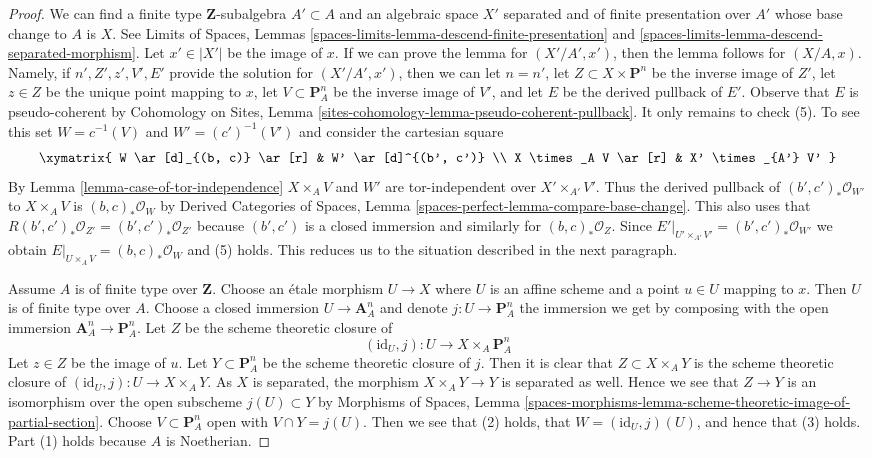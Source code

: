 \begin{proof}
We can find a finite type $\mathbf{Z}$-subalgebra $A' \subset A$
and an algebraic space $X'$ separated and of finite presentation over $A'$
whose base change to $A$ is $X$. See
Limits of Spaces, Lemmas
\ref{spaces-limits-lemma-descend-finite-presentation} and
\ref{spaces-limits-lemma-descend-separated-morphism}.
Let $x' \in |X'|$ be the image of $x$.
If we can prove the lemma for $(X'/A', x')$, then
the lemma follows for $(X/A, x)$.
Namely, if $n', Z', z', V', E'$ provide the solution
for $(X'/A', x')$, then we can let
$n = n'$,
let $Z \subset X \times \mathbf{P}^n$ be the inverse image of $Z'$,
let $z \in Z$ be the unique point mapping to $x$,
let $V \subset \mathbf{P}^n_A$ be the inverse image of $V'$, and
let $E$ be the derived pullback of $E'$.
Observe that $E$ is pseudo-coherent by
Cohomology on Sites, Lemma
\ref{sites-cohomology-lemma-pseudo-coherent-pullback}.
It only remains to check (5). To see this
set $W = c^{-1}(V)$ and $W' = (c')^{-1}(V')$
and consider the cartesian square
$$
\xymatrix{
W \ar[d]_{(b, c)} \ar[r] & W' \ar[d]^{(b', c')} \\
X \times_A V \ar[r] & X' \times_{A'} V'
}
$$
By Lemma \ref{lemma-case-of-tor-independence} $X \times_A V$ and $W'$
are tor-independent over $X' \times_{A'} V'$.
Thus the derived pullback of
$(b', c')_*\mathcal{O}_{W'}$ to $X \times_A V$
is $(b, c)_*\mathcal{O}_W$ by
Derived Categories of Spaces,
Lemma \ref{spaces-perfect-lemma-compare-base-change}.
This also uses that $R(b', c')_*\mathcal{O}_{Z'} = (b', c')_*\mathcal{O}_{Z'}$
because $(b', c')$ is a closed immersion and similarly for
$(b, c)_*\mathcal{O}_Z$.
Since $E'|_{U' \times_{A'} V'} =
(b', c')_*\mathcal{O}_{W'}$ we obtain
$E|_{U \times_A V} = (b, c)_*\mathcal{O}_W$
and (5) holds.
This reduces us to the situation described in the next
paragraph.

\medskip\noindent
Assume $A$ is of finite type over $\mathbf{Z}$.
Choose an \'etale morphism $U \to X$ where $U$ is an affine scheme
and a point $u \in U$ mapping to $x$. Then $U$ is of finite type over $A$.
Choose a closed immersion $U \to \mathbf{A}^n_A$ and denote
$j : U \to \mathbf{P}^n_A$ the immersion we get by composing
with the open immersion $\mathbf{A}^n_A \to \mathbf{P}^n_A$.
Let $Z$ be the scheme theoretic closure of
$$
(\text{id}_U, j) : U \longrightarrow X \times_A \mathbf{P}^n_A
$$
Let $z \in Z$ be the image of $u$.
Let $Y \subset \mathbf{P}^n_A$ be the scheme theoretic
closure of $j$. Then it is clear that $Z \subset X \times_A Y$
is the scheme theoretic closure of
$(\text{id}_U, j) : U \to X \times_A Y$.
As $X$ is separated, the morphism
$X \times_A Y \to Y$ is separated as well.
Hence we see that $Z \to Y$ is an isomorphism over
the open subscheme $j(U) \subset Y$ by
Morphisms of Spaces, Lemma
\ref{spaces-morphisms-lemma-scheme-theoretic-image-of-partial-section}.
Choose $V \subset \mathbf{P}^n_A$ open with $V \cap Y = j(U)$.
Then we see that (2) holds, that $W = (\text{id}_U, j)(U)$, and hence
that (3) holds. Part (1) holds because $A$ is Noetherian.


\end{proof}
